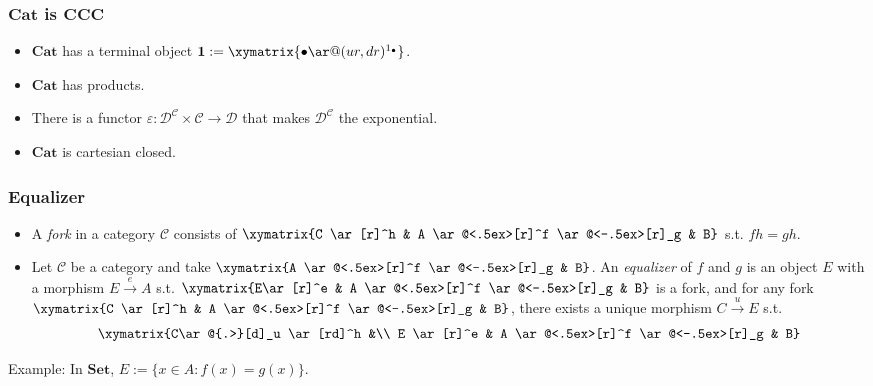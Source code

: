 \documentclass[UTF8,aspectratio=43,11pt,colorlinks,compress,openany]{beamer}%
\begin{document}
\begin{frame}\frametitle{$\mathbf{Cat}$ is $\mathbf{CCC}$}
\begin{itemize}
	\item $\mathbf{Cat}$ has a terminal object $\mathbf{1}:=\xymatrix{\bullet\ar@(ur,dr)^{1_\bullet}}$.
	\item $\mathbf{Cat}$ has products.
	\item There is a functor $\varepsilon: \mathcal{D}^{\mathcal{C}}\times\mathcal{C}\to\mathcal{D}$ that makes $\mathcal{D}^{\mathcal{C}}$ the exponential.
	\item $\mathbf{Cat}$ is cartesian closed.
\end{itemize}
\end{frame}

\begin{frame}\frametitle{Equalizer}
\setlength\abovedisplayskip{0pt}
\setlength\belowdisplayskip{0pt}
\begin{itemize}
	\item A \emph{fork} in a category $\mathcal{C}$ consists of $\xymatrix{C \ar[r]^h & A \ar@<.5ex>[r]^f \ar@<-.5ex>[r]_g & B}$ s.t. $fh=gh$.
	\item Let $\mathcal{C}$ be a category and take $\xymatrix{A \ar@<.5ex>[r]^f \ar@<-.5ex>[r]_g & B}$. An \emph{equalizer} of $f$ and $g$ is an object $E$ with a morphism $E\xrightarrow{e} A$ s.t. $\xymatrix{E\ar[r]^e & A \ar@<.5ex>[r]^f \ar@<-.5ex>[r]_g & B}$ is a fork, and for any fork $\xymatrix{C \ar[r]^h & A \ar@<.5ex>[r]^f \ar@<-.5ex>[r]_g & B}$, there exists a unique morphism $C\xrightarrow{u} E$ s.t. 
\[
\begin{array}{c}
\xymatrix{C\ar@{.>}[d]_u \ar[rd]^h &\\
E \ar[r]^e & A \ar@<.5ex>[r]^f \ar@<-.5ex>[r]_g & B}
\end{array}
\]
\end{itemize}
Example: In $\mathbf{Set}$, $E:=\{x\in A: f(x)=g(x)\}$.
\end{frame}
\end{document}

